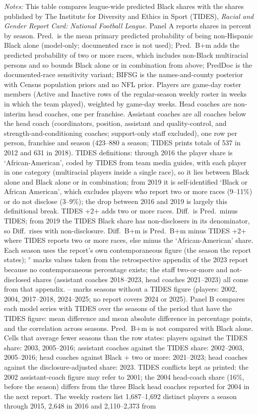 {\footnotesize
\noindent\textit{Notes:} This table compares league-wide predicted Black shares with the shares published by The Institute for Diversity and Ethics in Sport (TIDES), \textit{Racial and Gender Report Card: National Football League}. Panel A reports shares in percent by season. Pred.\ is the mean primary predicted probability of being non-Hispanic Black alone (model-only; documented race is not used); Pred.\ B+m adds the predicted probability of two or more races, which includes non-Black multiracial persons and so bounds Black alone or in combination from above; PredDoc is the documented-race sensitivity variant; BIFSG is the names-and-county posterior with Census population priors and no NFL prior. Players are game-day roster members (Active and Inactive rows of the regular-season weekly roster in weeks in which the team played), weighted by game-day weeks. Head coaches are non-interim head coaches, one per franchise. Assistant coaches are all coaches below the head coach (coordinators, position, assistant and quality-control, and strength-and-conditioning coaches; support-only staff excluded), one row per person, franchise and season (423--880 a season; TIDES prints totals of 537 in 2012 and 631 in 2018). TIDES definitions: through 2016 the player share is `African-American', coded by TIDES from team media guides, with each player in one category (multiracial players inside a single race), so it lies between Black alone and Black alone or in combination; from 2019 it is self-identified `Black or African American', which excludes players who report two or more races (9--11\%) or do not disclose (3--9\%); the drop between 2016 and 2019 is largely this definitional break. TIDES +2+ adds two or more races. Diff.\ is Pred.\ minus TIDES; from 2019 the TIDES Black share has non-disclosers in its denominator, so Diff.\ rises with non-disclosure. Diff.\ B+m is Pred.\ B+m minus TIDES +2+ where TIDES reports two or more races, else minus the `African-American' share. Each season uses the report's own contemporaneous figure (the season the report states); $^{r}$ marks values taken from the retrospective appendix of the 2023 report because no contemporaneous percentage exists; the staff two-or-more and not-disclosed shares (assistant coaches 2018--2023, head coaches 2021--2023) all come from that appendix. -- marks seasons without a TIDES figure (players: 2002, 2004, 2017--2018, 2024--2025; no report covers 2024 or 2025). Panel B compares each model series with TIDES over the seasons of the period that have the TIDES figure: mean difference and mean absolute difference in percentage points, and the correlation across seasons. Pred.\ B+m is not compared with Black alone. Cells that average fewer seasons than the row states: players against the TIDES share: 2003, 2005--2016; assistant coaches against the TIDES share: 2002--2003, 2005--2016; head coaches against Black + two or more: 2021--2023; head coaches against the disclosure-adjusted share: 2023. TIDES conflicts kept as printed: the 2002 assistant-coach figure may refer to 2001; the 2004 head-coach share (16\%, before the season) differs from the three Black head coaches reported for 2004 in the next report. The weekly rosters list 1,687--1,692 distinct players a season through 2015, 2,648 in 2016 and 2,110--2,373 from }
